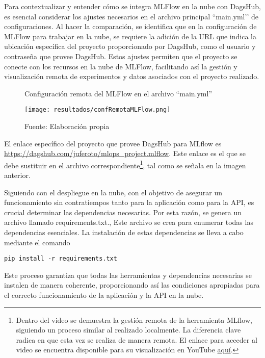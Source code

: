 Para contextualizar y entender cómo se integra MLFlow en la nube con DagsHub, es esencial considerar los ajustes necesarios en el archivo principal ``main.yml’’ de configuraciones. Al hacer la comparación, se identifica que en la configuración de MLFlow para trabajar en la nube, se requiere la adición de la URL que indica la ubicación específica del proyecto proporcionado por DagsHub, como el usuario y contraseña que provee DagsHub. Estos ajustes permiten que el proyecto se conecte con los recursos en la nube de MLFlow, facilitando así la gestión y visualización remota de experimentos y datos asociados con el proyecto realizado.

\newpage

\begin{figure}[h]
\centering
\caption{Configuración remota del MLFlow en el archivo ``main.yml''}
\texttt{[image: resultados/confRemotaMLFlow.png]}
\caption*{\footnotesize Fuente: Elaboración propia}
\label{fig:figuraOpcionesMLFlow}
\end{figure}

El enlace específico del proyecto que provee DagsHub para MLflow es \\ \href{https://dagshub.com/juferoto/mlops_project.mlflow}{https://dagshub.com/juferoto/mlops\_project.mlflow}. Este enlace es el que se debe sustituir en el archivo correspondiente\footnote{Dentro del video se demuestra la gestión remota de la herramienta MLflow, siguiendo un proceso similar al realizado localmente. La diferencia clave radica en que esta vez se realiza de manera remota. El enlace para acceder al video se encuentra disponible para su visualización en YouTube \href{https://youtu.be/U2DqNOixHWw?si=OrJcIFpGiqfodAQy}{aquí}.}, tal como se señala en la imagen anterior.

Siguiendo con el despliegue en la nube, con el objetivo de asegurar un funcionamiento sin contratiempos tanto para la aplicación como para la API, es crucial determinar las dependencias necesarias. Por esta razón, se genera un archivo llamado requirements.txt., Este archivo se crea para enumerar todas las dependencias esenciales. La instalación de estas dependencias se lleva a cabo mediante el comando 
\begin{verbatim}
pip install -r requirements.txt
\end{verbatim} 

Este proceso garantiza que todas las herramientas y dependencias necesarias se instalen de manera coherente, proporcionando así las condiciones apropiadas para el correcto funcionamiento de la aplicación y la API en la nube.


